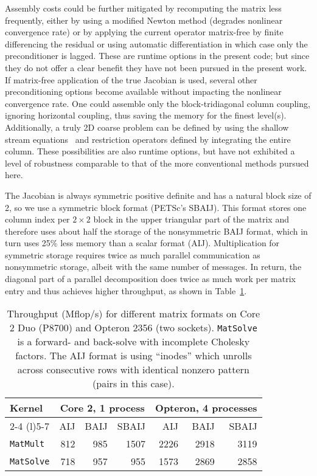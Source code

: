 Assembly costs could be further mitigated by recomputing the matrix less frequently, either by using a modified Newton method (degrades nonlinear convergence rate) or by applying the current operator matrix-free by finite differencing the residual or using automatic differentiation in which case only the preconditioner is lagged.
These are runtime options in the present code; but since they do not offer a clear benefit they have not been pursued in the present work.
If matrix-free application of the true Jacobian is used, several other preconditioning options become available without impacting the nonlinear convergence rate.
One could assemble only the block-tridiagonal column coupling, ignoring horizontal coupling, thus saving the memory for the finest level(s).
Additionally, a truly 2D coarse problem can be defined by using the shallow stream equations~\citep{morland1987unconfined,weis1999theory,schoof2006variational} and restriction operators defined by integrating the entire column.
These possibilities are also runtime options, but have not exhibited a level of robustness comparable to that of the more conventional methods pursued here.

The Jacobian is always symmetric positive definite and has a natural block size of 2, so we use a symmetric block format (PETSc's SBAIJ).  This format stores one column index per $2\times 2$ block in the upper triangular part of the matrix and therefore uses about half the storage of the nonsymmetric BAIJ format, which in turn uses 25\% less memory than a scalar format (AIJ). Multiplication for symmetric storage requires twice as much parallel communication as nonsymmetric storage, albeit with the same number of messages. In return, the diagonal part of a parallel decomposition does twice as much work per matrix entry and thus achieves higher throughput, as shown in Table~\ref{tab:sbaij}.

\begin{table}
  \centering\caption{Throughput (Mflop/s) for different matrix formats on Core 2 Duo (P8700) and Opteron 2356 (two sockets). \texttt{MatSolve} is a forward- and back-solve with incomplete Cholesky factors.  The AIJ format is using ``inodes'' which unrolls across consecutive rows with identical nonzero pattern (pairs in this case).}\label{tab:sbaij}
  \begin{tabular}{l rrr rrr}
    \toprule
    \multirow{3}{*}{Kernel} & \multicolumn{3}{c}{Core 2, 1 process} & \multicolumn{3}{c}{Opteron, 4 processes} \\
    \cmidrule(r){2-4} \cmidrule(l){5-7}
                      & AIJ & BAIJ & SBAIJ & AIJ  & BAIJ & SBAIJ \\
    \midrule
    \texttt{MatMult}  & 812 & 985  & 1507  & 2226 & 2918 & 3119  \\
    \texttt{MatSolve} & 718 & 957  & 955   & 1573 & 2869 & 2858  \\
    \bottomrule
  \end{tabular}
\end{table}


